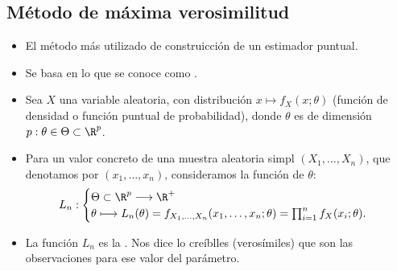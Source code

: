 \subsection{Método de máxima verosimilitud}
\begin{itemize}[label=\textbullet]
    \item El método más utilizado de construicción de un estimador puntual.
    \item Se basa en lo que se conoce como . 
\end{itemize}
\begin{tcolorbox}[colback=blue!5!white, colframe=blue!75!black, title=\textbf{Definición}]
\begin{itemize}[label=\textbullet]
    \item Sea $X$ una variable aleatoria, con distribución $x\longmapsto f_X(x;\theta)$ (función de densidad o función puntual de probabilidad), donde $\theta$ es de dimensión $p:\theta\in \Theta\subset \R^p$.
    \item Para un valor concreto de una muestra aleatoria simpl $(X_1,\dots,X_n)$, que denotamos por $(x_1,\dots,x_n)$, consideramos la función de $\theta$: \[
    L_n: \begin{cases}
        \Theta\subset \R^p\longrightarrow \R^+\\
        \theta\longmapsto L_n(\theta)=f_{X_1,\dots,X_n}(x_1,\dots,x_n;\theta)=\prod_{i=1}^{n} f_X(x_i;\theta). 
    \end{cases}
    \] 
\item La función $L_n$ es la  . Nos dice lo creíblles (verosímiles) que son las observaciones para ese valor del parámetro. 
\end{itemize}
\end{tcolorbox}
